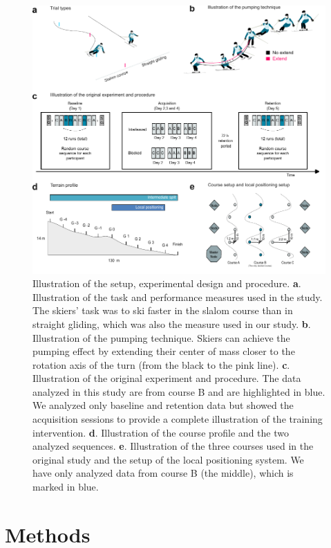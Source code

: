 \documentclass{article}
\begin{document}
\begin{figure}[H]
\centering
\includegraphics{figurer/figure_design_2.pdf}
\caption{Illustration of the setup, experimental design and procedure. \textbf{a}. Illustration of the task and performance measures used in the study. The skiers' task was to ski faster in the slalom course than in straight gliding, which was also the measure used in our study. \textbf{b}. Illustration of the pumping technique. Skiers can achieve the pumping effect by extending their center of mass closer to the rotation axis of the turn (from the black to the pink line). \textbf{c}. Illustration of the original experiment and procedure. The data analyzed in this study are from course B and are highlighted in blue. We analyzed only baseline and retention data but showed the acquisition sessions to provide a complete illustration of the training intervention. \textbf{d}. Illustration of the course profile and the two analyzed sequences. \textbf{e}. Illustration of the three courses used in the original study and the setup of the local positioning system. We have only analyzed data from course B (the middle), which is marked in blue.}\label{fig: design}
\end{figure}


 


\section{Methods}
\end{document}
